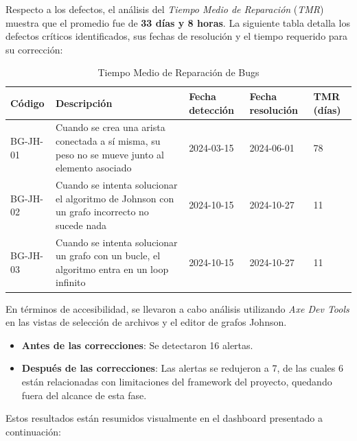 \documentclass[stu, 12pt, letterpaper, donotrepeattitle, floatsintext, natbib]{apa7}
\begin{document}
\noindent Respecto a los defectos, el análisis del \textit{Tiempo Medio de Reparación} (\textit{TMR}) muestra que el promedio fue de \textbf{33 días y 8 horas}. La siguiente tabla detalla los defectos críticos identificados, sus fechas de resolución y el tiempo requerido para su corrección:  

\begin{table}[H]
    \caption{Tiempo Medio de Reparación de Bugs}
    \centering
    \begin{tabularx}{\textwidth}{|l|X|l|l|l|}
        \hline
        \textbf{Código} & \textbf{Descripción} & \textbf{Fecha detección} & \textbf{Fecha resolución} & \textbf{TMR (días)} \\ \hline
        BG-JH-01 & Cuando se crea una arista conectada a sí misma, su peso no se mueve junto al elemento asociado & 2024-03-15 & 2024-06-01 & 78 \\ \hline
        BG-JH-02 & Cuando se intenta solucionar el algoritmo de Johnson con un grafo incorrecto no sucede nada & 2024-10-15 & 2024-10-27 & 11 \\ \hline
        BG-JH-03 & Cuando se intenta solucionar un grafo con un bucle, el algoritmo entra en un loop infinito & 2024-10-15 & 2024-10-27 & 11 \\ \hline
    \end{tabularx}
\end{table}

\noindent En términos de accesibilidad, se llevaron a cabo análisis utilizando \textit{Axe Dev Tools} en las vistas de selección de archivos y el editor de grafos Johnson.  

\begin{itemize}
    \item \textbf{Antes de las correcciones}: Se detectaron 16 alertas.  
    \item \textbf{Después de las correcciones}: Las alertas se redujeron a 7, de las cuales 6 están relacionadas con limitaciones del framework del proyecto, quedando fuera del alcance de esta fase.  
\end{itemize}

\noindent Estos resultados están resumidos visualmente en el dashboard presentado a continuación:  
\end{document}
